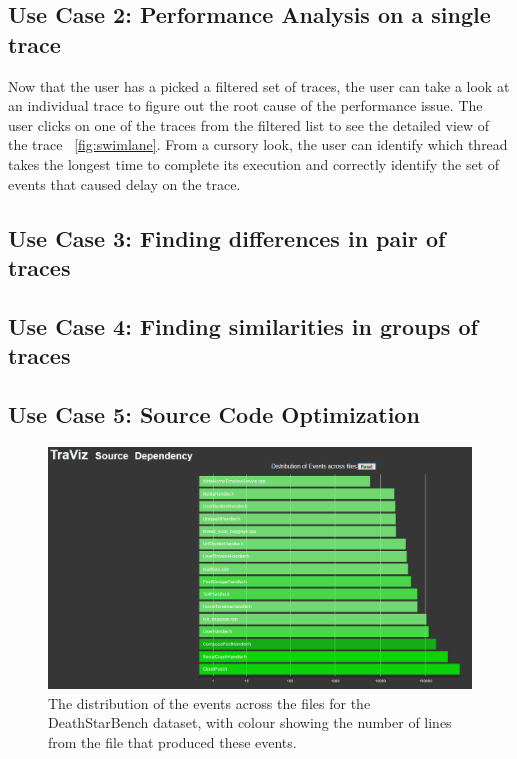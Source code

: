 \subsection{Use Case 2: Performance Analysis on a single trace}

Now that the user has a picked a filtered set of traces, the user
can take a look at an individual trace to figure out the root
cause of the performance issue. The user clicks on one of the
traces from the filtered list to see the detailed view
of the trace ~\ref{fig:swimlane}. From a cursory look,
the user can identify which thread takes the longest time to complete
its execution and correctly identify the set of events that caused delay
on the trace.

\subsection{Use Case 3: Finding differences in pair of traces}

\subsection{Use Case 4: Finding similarities in groups of traces}

\subsection{Use Case 5: Source Code Optimization}

\begin{figure}
    \centering
    \includegraphics[width=\textwidth]{fig/sourcecode1}
    \caption{The distribution of the events across the files for the DeathStarBench dataset, with colour showing the number of lines from the
    file that produced these events.}
    \label{fig:source1}
\end{figure}

